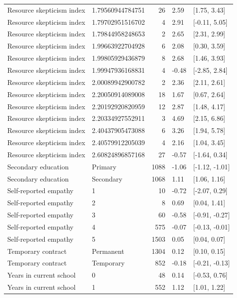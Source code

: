 \begin{tabular}{llrll}
\addlinespace
Resource skepticism index & 1.79560944784751 & 26 & 2.59 & {}[1.75, 3.43]\\
Resource skepticism index & 1.79702951516702 & 4 & 2.91 & {}[-0.11, 5.05]\\
Resource skepticism index & 1.79844958248653 & 2 & 2.65 & {}[2.31, 2.99]\\
Resource skepticism index & 1.99663922704928 & 6 & 2.08 & {}[0.30, 3.59]\\
Resource skepticism index & 1.99805929436879 & 8 & 2.68 & {}[1.46, 3.93]\\
\addlinespace
Resource skepticism index & 1.99947936168831 & 4 & -0.48 & {}[-2.85, 2.84]\\
Resource skepticism index & 2.00089942900782 & 2 & 2.36 & {}[2.11, 2.61]\\
Resource skepticism index & 2.20050914089008 & 18 & 1.67 & {}[0.67, 2.64]\\
Resource skepticism index & 2.20192920820959 & 12 & 2.87 & {}[1.48, 4.17]\\
Resource skepticism index & 2.20334927552911 & 3 & 4.69 & {}[2.15, 6.86]\\
\addlinespace
Resource skepticism index & 2.40437905473088 & 6 & 3.26 & {}[1.94, 5.78]\\
Resource skepticism index & 2.40579912205039 & 4 & 2.16 & {}[1.04, 3.45]\\
Resource skepticism index & 2.60824896857168 & 27 & -0.57 & {}[-1.64, 0.34]\\
Secondary education & Primary & 1088 & -1.06 & {}[-1.12, -1.01]\\
Secondary education & Secondary & 1068 & 1.11 & {}[1.06, 1.16]\\
\addlinespace
Self-reported empathy & 1 & 10 & -0.72 & {}[-2.07, 0.29]\\
Self-reported empathy & 2 & 8 & 0.69 & {}[0.04, 1.41]\\
Self-reported empathy & 3 & 60 & -0.58 & {}[-0.91, -0.27]\\
Self-reported empathy & 4 & 575 & -0.07 & {}[-0.13, -0.01]\\
Self-reported empathy & 5 & 1503 & 0.05 & {}[0.04, 0.07]\\
\addlinespace
Temporary contract & Permanent & 1304 & 0.12 & {}[0.10, 0.15]\\
Temporary contract & Temporary & 852 & -0.18 & {}[-0.21, -0.13]\\
Years in current school & 0 & 48 & 0.14 & {}[-0.53, 0.76]\\
Years in current school & 1 & 552 & 1.12 & {}[1.01, 1.22]\\

\end{tabular}
